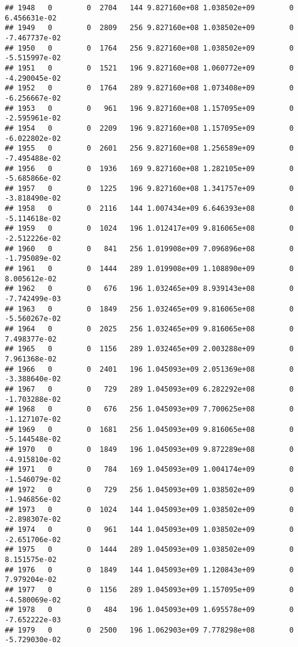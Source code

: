 \documentclass[
]{article}
\begin{document}
\begin{enumerate}
\begin{verbatim}
## 1948   0        0  2704   144 9.827160e+08 1.038502e+09        0  6.456631e-02
## 1949   0        0  2809   256 9.827160e+08 1.038502e+09        0 -7.467737e-02
## 1950   0        0  1764   256 9.827160e+08 1.038502e+09        0 -5.515997e-02
## 1951   0        0  1521   196 9.827160e+08 1.060772e+09        0 -4.290045e-02
## 1952   0        0  1764   289 9.827160e+08 1.073408e+09        0 -6.256667e-02
## 1953   0        0   961   196 9.827160e+08 1.157095e+09        0 -2.595961e-02
## 1954   0        0  2209   196 9.827160e+08 1.157095e+09        0 -6.022802e-02
## 1955   0        0  2601   256 9.827160e+08 1.256589e+09        0 -7.495488e-02
## 1956   0        0  1936   169 9.827160e+08 1.282105e+09        0 -5.685866e-02
## 1957   0        0  1225   196 9.827160e+08 1.341757e+09        0 -3.818490e-02
## 1958   0        0  2116   144 1.007434e+09 6.646393e+08        0 -5.114618e-02
## 1959   0        0  1024   196 1.012417e+09 9.816065e+08        0 -2.512226e-02
## 1960   0        0   841   256 1.019908e+09 7.096896e+08        0 -1.795089e-02
## 1961   0        0  1444   289 1.019908e+09 1.108890e+09        0  8.005612e-02
## 1962   0        0   676   196 1.032465e+09 8.939143e+08        0 -7.742499e-03
## 1963   0        0  1849   256 1.032465e+09 9.816065e+08        0 -5.560267e-02
## 1964   0        0  2025   256 1.032465e+09 9.816065e+08        0  7.498377e-02
## 1965   0        0  1156   289 1.032465e+09 2.003288e+09        0  7.961368e-02
## 1966   0        0  2401   196 1.045093e+09 2.051369e+08        0 -3.388640e-02
## 1967   0        0   729   289 1.045093e+09 6.282292e+08        0 -1.703288e-02
## 1968   0        0   676   256 1.045093e+09 7.700625e+08        0 -1.127107e-02
## 1969   0        0  1681   256 1.045093e+09 9.816065e+08        0 -5.144548e-02
## 1970   0        0  1849   196 1.045093e+09 9.872289e+08        0 -4.915810e-02
## 1971   0        0   784   169 1.045093e+09 1.004174e+09        0 -1.546079e-02
## 1972   0        0   729   256 1.045093e+09 1.038502e+09        0 -1.946856e-02
## 1973   0        0  1024   144 1.045093e+09 1.038502e+09        0 -2.898307e-02
## 1974   0        0   961   144 1.045093e+09 1.038502e+09        0 -2.651706e-02
## 1975   0        0  1444   289 1.045093e+09 1.038502e+09        0  8.151575e-02
## 1976   0        0  1849   144 1.045093e+09 1.120843e+09        0  7.979204e-02
## 1977   0        0  1156   289 1.045093e+09 1.157095e+09        0 -4.580069e-02
## 1978   0        0   484   196 1.045093e+09 1.695578e+09        0 -7.652222e-03
## 1979   0        0  2500   196 1.062903e+09 7.778298e+08        0 -5.729030e-02

\end{verbatim}
\end{enumerate}
\end{document}
